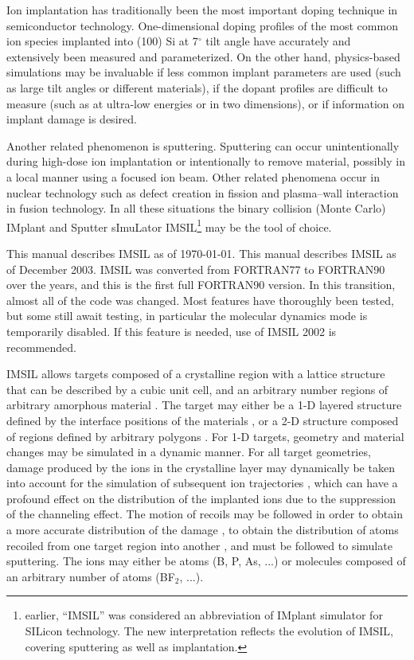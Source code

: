Ion implantation has traditionally been the most important doping technique in
semiconductor technology. One-dimensional doping profiles of the most common ion species 
implanted into (100) Si at 7$^\circ$ tilt angle have accurately and extensively 
been measured and parameterized.  On the other hand, physics-based simulations 
may be invaluable if less common implant parameters are used (such as large tilt
angles or different materials), if the dopant profiles are difficult to
measure (such as at ultra-low energies or in two dimensions), or if
information on implant damage is desired. 

Another related phenomenon is sputtering. Sputtering can occur unintentionally
during high-dose ion implantation or intentionally to remove material, possibly
in a local manner using a focused ion beam. Other related phenomena occur in
nuclear technology such as defect creation in fission and plasma--wall 
interaction in fusion technology. In all these situations the binary
collision (Monte Carlo) IMplant and Sputter sImuLator IMSIL\footnote{earlier,
``IMSIL'' was considered an abbreviation of IMplant simulator for SILicon
technology. The new interpretation reflects the evolution of IMSIL, covering
sputtering as well as implantation.} may be the tool of choice.


This manual describes IMSIL as of \today. 
\ifprivate
This manual describes IMSIL as of December 2003.  IMSIL was converted from
FORTRAN77 to FORTRAN90 over the years, and this is the first full FORTRAN90
version.  In this transition, almost all of the code was changed.  Most
features have thoroughly been tested, but some still await testing, in
particular the molecular dynamics mode is temporarily disabled.  If this
feature is needed, use of IMSIL 2002 is recommended.
\fi 

IMSIL allows targets composed of a crystalline region with a lattice structure
that can be described by a cubic unit cell, and an arbitrary number regions of
arbitrary amorphous material \cite{hobler_monte_1995}. The target may either be
a 1-D layered structure defined by the interface positions of the materials
\cite{hobler_effect_1992,hobler_channeling_1999}, or a 2-D structure composed of
regions defined by arbitrary polygons \cite{hobler_monte_1989,
hobler_simulation_2003}. For 1-D targets, geometry and material changes may be
simulated in a dynamic manner. For all target geometries, damage produced by
the ions in the crystalline layer may dynamically be taken into account for the
simulation of subsequent ion trajectories
\cite{simionescu_two-dimensional_1993}, which can have a profound effect on the
distribution of the implanted ions due to the suppression of the channeling
effect. The motion of recoils may be followed in order to obtain a more accurate
distribution of the damage \cite{hobler_two-dimensional_1988}, to obtain the
distribution of atoms recoiled from one target region into another
\cite{Moe85}, and must be followed to simulate sputtering. The ions may either
be atoms (B, P, As, ...) or molecules composed of an arbitrary number of atoms
(BF$_2$, ...).

